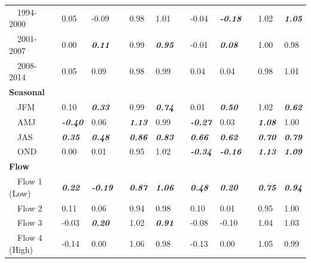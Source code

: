\documentclass[letterpaper,12pt,oneside]{article}\usepackage[]{graphicx}\usepackage[]{color}
\begin{document}
\begin{table}[!tbp]
\begin{center}
\begin{tabular}{lllcllcllcll}
~~1994-2000&0.05&-0.09&&0.98&1.01&&-0.04&{\bf \textit{-0.18}}&&1.02&{\bf \textit{1.05}}\tabularnewline
~~2001-2007&0.00&{\bf \textit{0.11}}&&0.99&{\bf \textit{0.95}}&&-0.01&{\bf \textit{0.08}}&&1.00&0.98\tabularnewline
~~2008-2014&0.05&0.09&&0.98&0.99&&0.04&0.04&&0.98&1.01\tabularnewline
\hline
{\bfseries Seasonal}&&&&&&&&&&&\tabularnewline
~~JFM&0.10&{\bf \textit{0.33}}&&0.99&{\bf \textit{0.74}}&&0.01&{\bf \textit{0.50}}&&1.02&{\bf \textit{0.62}}\tabularnewline
~~AMJ&{\bf \textit{-0.40}}&0.06&&{\bf \textit{1.13}}&0.99&&{\bf \textit{-0.27}}&0.03&&{\bf \textit{1.08}}&1.00\tabularnewline
~~JAS&{\bf \textit{0.35}}&{\bf \textit{0.48}}&&{\bf \textit{0.86}}&{\bf \textit{0.83}}&&{\bf \textit{0.66}}&{\bf \textit{0.62}}&&{\bf \textit{0.70}}&{\bf \textit{0.79}}\tabularnewline
~~OND&0.00&0.01&&0.95&1.02&&{\bf \textit{-0.34}}&{\bf \textit{-0.16}}&&{\bf \textit{1.13}}&{\bf \textit{1.09}}\tabularnewline
\hline
{\bfseries Flow}&&&&&&&&&&&\tabularnewline
~~Flow 1 (Low)&{\bf \textit{0.22}}&{\bf \textit{-0.19}}&&{\bf \textit{0.87}}&{\bf \textit{1.06}}&&{\bf \textit{0.48}}&{\bf \textit{0.20}}&&{\bf \textit{0.75}}&{\bf \textit{0.94}}\tabularnewline
~~Flow 2&0.11&0.06&&0.94&0.98&&0.10&0.01&&0.95&1.00\tabularnewline
~~Flow 3&-0.03&{\bf \textit{0.20}}&&1.02&{\bf \textit{0.91}}&&-0.08&-0.10&&1.04&1.03\tabularnewline
~~Flow 4 (High)&-0.14&0.00&&1.06&0.98&&-0.13&0.00&&1.05&0.99\tabularnewline
\hline
\end{tabular}\end{center}

\end{table}
\end{document}
